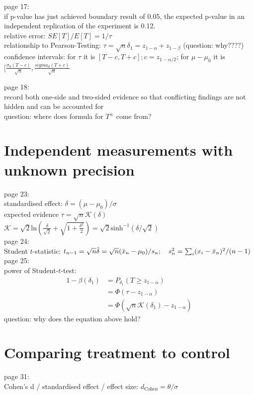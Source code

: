 page 17:\\
if p-value has just achieved boundary result of 0.05, the expected p-value in an independent replication of the experiment is 0.12.\\
relative error: $SE[T]/E[T]=1/\tau$\\
relationship to Pearson-Testing: $\tau = \sqrt{n}\delta_1 = z_{1-\alpha}+z_{1-\beta}$ (question: why????)\\
confidence intervals: for $\tau$ it is $[T-c,T+c]; c = z_{1-\alpha/2}$; for $\mu-\mu_0$ it is $[\frac{\sigma_0(T-c)}{\sqrt{n}},\frac{sigma_0(T+c)}{\sqrt{n}}$

page 18:\\
record both one-side and two-sided evidence so that conflicting findings are not hidden and can be accounted for\\
question: where does formula for $T^{\pm}$ come from?

\section{Independent measurements with unknown precision}
page 23:\\
standardised effect: $\delta = (\mu - \mu_0)/\sigma$\\
expected evidence $\tau = \sqrt{n}\mathcal{K}(\delta)$\\
$\mathcal{K}=\sqrt{2}\text{ln}(\frac{\delta}{\sqrt{2}}+\sqrt{1+\frac{\delta^2}{2}})=\sqrt{2}\text{sinh}^{-1}(\delta/\sqrt{2})$\\

page 24:\\
Student $t$-statistic: $t_{n-1}=\sqrt{n}\hat{\delta} = \sqrt{n}(\Bar{x}_n-\mu_0)/s_n;\quad s^2_n = \sum_i(x_i-\Bar{x}_n)^2/(n-1)$\\

page 25:\\
power of Student-$t$-test: 
\begin{align*}
    1-\beta(\delta_1)&= P_{\delta_1}(T \geq z_{1-\alpha})\\ 
    &= \Phi(\tau-z_{1-\alpha}) \\
    &= \Phi(\sqrt{n}\mathcal{K}(\delta_1)-z_{1-\alpha}) 
\end{align*}
question: why does the equation above hold?

\section{Comparing treatment to control}
page 31:\\
Cohen's d / standardised effect / effect size: $d_{\text{Cohen}}=\theta/\sigma$\\

